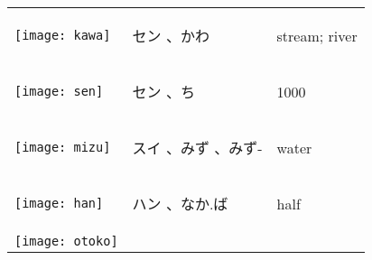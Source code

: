 \documentclass[a4paper,12pt]{extarticle}
\begin{document}
\begin{longtable}{|lp{6cm}p{4cm}|}
	\begin{minipage}{0.3\textwidth}
		\centerline{
			\texttt{[image: kawa]}
		}
	\end{minipage}
	                                   &
	\begin{CJK}{UTF8}{min} セン 、かわ\end{CJK}
	                                   &
	stream; river
	\\
	\begin{minipage}{0.3\textwidth}
		\centerline{
			\texttt{[image: sen]}
		}
	\end{minipage}
	                                   &
	\begin{CJK}{UTF8}{min} セン 、ち\end{CJK}
	                                   &
	1000
	\\
	\begin{minipage}{0.3\textwidth}
		\centerline{
			\texttt{[image: mizu]}
		}
	\end{minipage}
	                                   &
	\begin{CJK}{UTF8}{min} スイ 、みず 、みず-\end{CJK}
	                                   &
	water
	\\
	\begin{minipage}{0.3\textwidth}
		\centerline{
			\texttt{[image: han]}
		}
	\end{minipage}
	                                   &
	\begin{CJK}{UTF8}{min}ハン 、なか.ば\end{CJK}
	                                   &
	half
	\\
	\begin{minipage}{0.3\textwidth}
		\centerline{
			\texttt{[image: otoko]}
		}
	\end{minipage}

\end{longtable}
\end{document}
